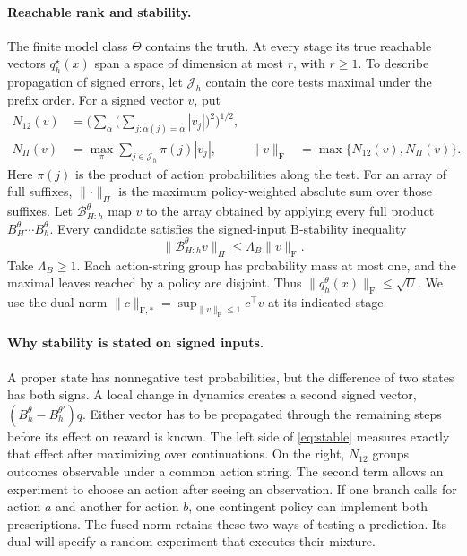 \documentclass[sigconf,nonacm]{acmart}
\newcommand{\B}{\mathcal B}
\newcommand{\st}{\star}
\newcommand{\fused}[1]{\lVert #1\rVert_{\mathrm F}}
\newcommand{\dual}[1]{\lVert #1\rVert_{\mathrm F,*}}
\newcommand{\pn}[1]{\lVert #1\rVert_{\Pi}}
\begin{document}
\paragraph{Reachable rank and stability.}
The finite model class $\Theta$ contains the truth. At every stage its true reachable vectors $q_h^\st(x)$ span a space of dimension at most $r$, with $r\ge1$. To describe propagation of signed errors, let $\mathcal J_h$ contain the core tests maximal under the prefix order. For a signed vector $v$, put
\begin{align}
 N_{12}(v)&=\Big(\sum_\alpha\big(\sum_{j:\alpha(j)=\alpha}|v_j|\big)^2\Big)^{1/2},
 \nonumber\\
 N_{\Pi}(v)&=\max_\pi\sum_{j\in\mathcal J_h}\pi(j)|v_j|,
 &\fused{v}&=\max\{N_{12}(v),N_\Pi(v)\}.
 \label{eq:fused}
\end{align}
Here $\pi(j)$ is the product of action probabilities along the test. For an array of full suffixes, $\pn{\cdot}$ is the maximum policy-weighted absolute sum over those suffixes. Let $\B^\theta_{H:h}$ map $v$ to the array obtained by applying every full product $B^\theta_H\cdots B^\theta_h$. Every candidate satisfies the signed-input B-stability inequality \cite{bstable}
\begin{equation}
 \pn{\B^\theta_{H:h}v}\le \Lambda_B\fused{v}.
 \label{eq:stable}
\end{equation}
Take $\Lambda_B\ge1$. Each action-string group has probability mass at most one, and the maximal leaves reached by a policy are disjoint. Thus $\fused{q_h^\theta(x)}\le\sqrt U$. We use the dual norm $\dual{c}=\sup_{\fused v\le1}c^\top v$ at its indicated stage.

\paragraph{Why stability is stated on signed inputs.}
A proper state has nonnegative test probabilities, but the difference of two states has both signs. A local change in dynamics creates a second signed vector, $(B_h^\theta-B_h^{\theta'})q$. Either vector has to be propagated through the remaining steps before its effect on reward is known. The left side of \eqref{eq:stable} measures exactly that effect after maximizing over continuations. On the right, $N_{12}$ groups outcomes observable under a common action string. The second term allows an experiment to choose an action after seeing an observation. If one branch calls for action $a$ and another for action $b$, one contingent policy can implement both prescriptions. The fused norm retains these two ways of testing a prediction. Its dual will specify a random experiment that executes their mixture.
\end{document}
